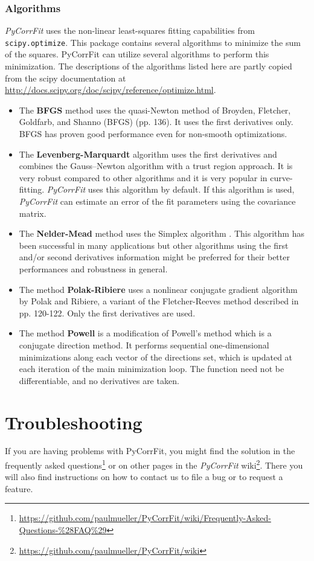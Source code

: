 \subsubsection{Algorithms}
\label{sec:theor.alg}
\textit{PyCorrFit} uses the non-linear least-squares fitting capabilities from \texttt{scipy.optimize}. This package contains several algorithms to minimize the sum of the squares. 
PyCorrFit can utilize several algorithms to perform this minimization. The descriptions of the algorithms listed here are partly copied from the scipy documentation at \url{http://docs.scipy.org/doc/scipy/reference/optimize.html}. 
\begin{itemize}
\item The \textbf{BFGS} method uses the quasi-Newton method of Broyden, Fletcher, Goldfarb, and Shanno (BFGS) \cite{Nocedal2006} (pp. 136). It uses the first derivatives only. BFGS has proven good performance even for non-smooth optimizations.
\item The \textbf{Levenberg-Marquardt} algorithm \cite{Levenberg1944} uses the first derivatives and combines the Gauss–Newton algorithm with a trust region approach. It is very robust compared to other algorithms and it is very popular in curve-fitting. \textit{PyCorrFit} uses this algorithm by default. If this algorithm is used, \textit{PyCorrFit} can estimate an error of the fit parameters using the covariance matrix.
\item The \textbf{Nelder-Mead} method uses the Simplex algorithm \cite{Nelder1965,Wright1996}. This algorithm has been successful in many applications but other algorithms using the first and/or second derivatives information might be preferred for their better performances and robustness in general.
\item The method \textbf{Polak-Ribiere} uses a nonlinear conjugate gradient algorithm by Polak and Ribiere, a variant of the Fletcher-Reeves method described in \cite{Nocedal2006} pp.
120-122. Only the first derivatives are used.
\item The method \textbf{Powell} is a modification of Powell's method \cite{Powell1964, Press} which is a conjugate direction method. It performs sequential one-dimensional minimizations along each vector of the directions set, which is updated at each iteration of the main minimization loop. The function need not be differentiable, and no derivatives are taken.
\end{itemize}



\section{Troubleshooting}
If you are having problems with PyCorrFit, you might find the solution in the frequently asked questions\footnote{\url{https://github.com/paulmueller/PyCorrFit/wiki/Frequently-Asked-Questions-\%28FAQ\%29}} or on other pages in the \textit{PyCorrFit} 
wiki\footnote{\url{https://github.com/paulmueller/PyCorrFit/wiki}}.
There you will also find instructions on how to contact us to file a bug or to request a feature.
